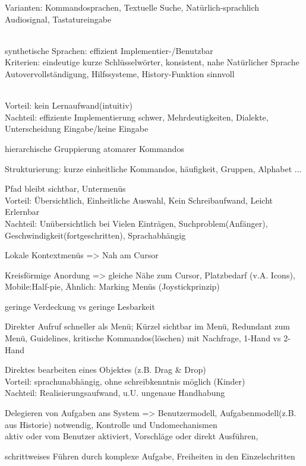Varianten: Kommandosprachen, Textuelle Suche, Natürlich-sprachlich\\
Audiosignal, Tastatureingabe

\\
synthetische Sprachen: effizient Implementier-/Benutzbar\\
Kriterien: eindeutige kurze Schlüsselwörter, konsistent, nahe Natürlicher Sprache\\
Autovervollständigung, Hilfssysteme, History-Funktion sinnvoll

\\
Vorteil: kein Lernaufwand(intuitiv)\\
Nachteil: effiziente Implementierung schwer, Mehrdeutigkeiten, Dialekte, Unterscheidung Eingabe/keine Eingabe

hierarchische Gruppierung atomarer Kommandos

Strukturierung: kurze einheitliche Kommandos, häufigkeit, Gruppen, Alphabet ... 

Pfad bleibt sichtbar, Untermenüs\\
Vorteil: Übersichtlich, Einheitliche Auswahl, Kein Schreibaufwand, Leicht Erlernbar\\
Nachteil: Unübersichtlich bei Vielen Einträgen, Suchproblem(Anfänger), Geschwindigkeit(fortgeschritten), Sprachabhängig

Lokale Kontextmenüs => Nah am Cursor

Kreisförmige Anordung => gleiche Nähe zum Cursor, Platzbedarf (v.A. Icons), \\
Mobile:Half-pie, Ähnlich: Marking Menüs (Joystickprinzip)

geringe Verdeckung vs geringe Lesbarkeit

Direkter Aufruf schneller als Menü; Kürzel sichtbar im Menü, Redundant zum Menü, Guidelines, kritische Kommandos(löschen) mit Nachfrage, 1-Hand vs 2-Hand

Direktes bearbeiten eines Objektes (z.B. Drag \& Drop)\\
Vorteil: sprachunabhängig, ohne schreibkenntnis möglich (Kinder)\\
Nachteil: Realisierungsaufwand, u.U. ungenaue Handhabung

Delegieren von Aufgaben ans System => Benutzermodell, Aufgabenmodell(z.B. aus Historie) notwendig, Kontrolle und Undomechanismen\\
aktiv oder vom Benutzer aktiviert, Vorschläge oder direkt Ausführen, 

schrittweises Führen durch komplexe Aufgabe, Freiheiten in den Einzelschritten

